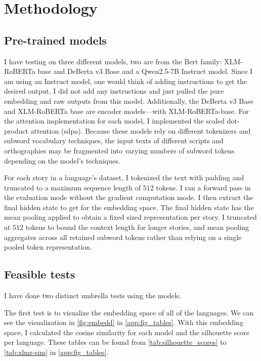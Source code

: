 \documentclass[11pt]{article} %
\begin{document}
    \section{Methodology}
    \subsection{Pre-trained models}
    I have testing on three different models, two are from the Bert family: XLM-RoBERTa
    base \citep{DBLP:journals/corr/abs-1911-02116} and DeBerta v3 Base \citep{he2021debertav3, he2021deberta}
    and a Qwen2.5-7B Instruct \citep{qwen2.5, qwen2} model. Since I am using an
    Instruct model, one would think of adding instructions to get the desired output,
    I did not add any instructions and just pulled the pure embedding and raw
    outputs from this model. Additionally, the DeBerta v3 Base \citep{he2021debertav3, he2021deberta}
    and XLM-RoBERTa base \citep{DBLP:journals/corr/abs-1911-02116} are encoder
    models—with XLM-RoBERTa-base. For the attention implementation for each model,
    I implemented the scaled dot-product attention (sdpa). Because these models rely
    on different tokenizers and subword vocabulary techniques, the input texts
    of different scripts and orthographies may be fragmented into varying
    numbers of subword tokens depending on the model's techniques.

    For each story in a language's dataset, I tokenized the text with padding and
    truncated to a maximum sequence length of $512$ tokens. I ran a forward pass
    in the evaluation mode without the gradient computation mode. I then extract the
    final hidden state to get for the embedding space. The final hidden state
    has the mean pooling applied to obtain a fixed sized representation per
    story. I truncated at $512$ tokens to bound the context length for longer stories,
    and mean pooling aggregates across all retained subword tokens rather than
    relying on a single pooled token representation.

    \subsection{Feasible tests}
    I have done two distinct umbrella tests using the models.

    The first test is to visualize the embedding space of all of the languages. We
    can see the visualization in \autoref{fig:embedd} in \autoref{app:fig_tables}.
    With this embedding space, I calculated the cosine similarity for each model and
    the silhouette score per language. These tables can be found from
    \autoref{tab:silhouette_scores} to \ref{tab:xlmr-sim} in
    \autoref{app:fig_tables}.
\end{document}
